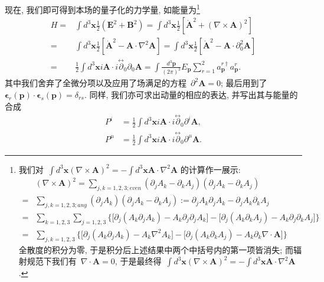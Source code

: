 现在, 我们即可得到本场的量子化的力学量, 如能量为\footnote{
我们对~$\int d^3\bm{x}(\nabla\times\bm{A})^2=-\int d^3\bm{x}\bm{A}\cdot\nabla^2\bm{A}$ 的计算作一展示:
\begin{align}
&(\nabla\times\bm{A})^2=\sum_{j,k=1,2,3;even}(\partial_jA_k-\partial_kA_j)(\partial_jA_k-\partial_kA_j)\nonumber\\
=&\sum_{j,k=1,2,3;any}(\partial_jA_k)(\partial_jA_k-\partial_kA_j):=\partial_jA_k\partial_jA_k-\partial_jA_k\partial_kA_j\nonumber\\
=&\sum_{k=1,2,3}\sum_{j=1,2,3}\bigg\{\Big[\partial_j(A_k\partial_jA_k)-A_k\partial_j\partial_jA_k\Big]-\Big[\partial_j(A_k\partial_kA_j)-A_k\partial_j\partial_kA_j\Big]\bigg\}\nonumber\\
=&\sum_{j,k=1,2,3}\bigg\{\Big[\partial_j(A_k\partial_jA_k)-A_k\nabla^2A_k\Big]-\Big[\partial_j(A_k\partial_kA_j)-A_k\partial_k\nabla\cdot\bm{A}\Big]\bigg\}
\end{align}
全散度的积分为零, 于是积分后上述结果中两个中括号内的第一项皆消失; 而辐射规范下我们有~$\nabla\cdot\bm{A}=0$, 于是最终得~$\int d^3\bm{x}(\nabla\times\bm{A})^2=-\int d^3\bm{x}\bm{A}\cdot\nabla^2\bm{A}$.
}
\begin{align}
H=&\int d^3\bm{x}\frac{1}{2}(\bm{E}^2+\bm{B}^2)=\int d^3\bm{x}\frac{1}{2}\left[\dot{\bm{A}}^2+(\nabla\times\bm{A})^2\right]\nonumber\\
=&\int d^3\bm{x}\frac{1}{2}\left[\dot{\bm{A}}^2-\bm{A}\cdot\nabla^2\bm{A}\right]=\int d^3\bm{x}\frac{1}{2}\left[\dot{\bm{A}}^2-\bm{A}\cdot\partial^2_0\bm{A}\right]\nonumber\\
=&\frac{1}{2}\int d^3\bm{x}i\bm{A}\cdot i\overset{\leftrightarrow}{\partial}_0\partial_0\bm{A}=\int\frac{d^3\bm{p}}{(2\pi)^3}E_{\bm{p}}\sum_{r=1}^2a^{r\dag}_{\bm{p}}a^r_{\bm{p}}.
\end{align}
其中我们舍弃了全微分项以及应用了场满足的方程~$\partial^2\bm{A}=0$; 最后用到了~$\bm{\epsilon}_r(\bm{p})\cdot\bm{\epsilon}_s(\bm{p})=\delta_{rs}$. 同样, 我们亦可求出动量的相应的表达, 并写出其与能量的合成
\begin{align}
P^i&=\frac{1}{2}\int d^3\bm{x}i\bm{A}\cdot i\overset{\leftrightarrow}{\partial}_0\partial^i\bm{A},\\
P^\mu&=\frac{1}{2}\int d^3\bm{x}i\bm{A}\cdot i\overset{\leftrightarrow}{\partial}_0\partial^\mu\bm{A}.
\end{align}



